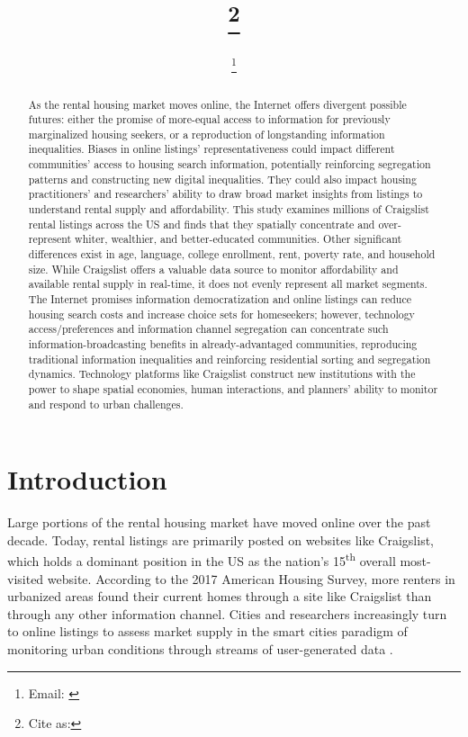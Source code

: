 \documentclass[11pt,letterpaper]{article}
\begin{document}
	
\title{\papertitle\footnote{{Cite as: \papercitation}}}
\date{\paperdate}
\author[]{\myname\footnote{Email: \href{mailto:\myemail}{\myemail}}}
\affil[]{\myaffiliation}

\maketitle

\begin{abstract}
As the rental housing market moves online, the Internet offers divergent possible futures: either the promise of more-equal access to information for previously marginalized housing seekers, or a reproduction of longstanding information inequalities. Biases in online listings' representativeness could impact different communities' access to housing search information, potentially reinforcing segregation patterns and constructing new digital inequalities. They could also impact housing practitioners' and researchers' ability to draw broad market insights from listings to understand rental supply and affordability. This study examines millions of Craigslist rental listings across the US and finds that they spatially concentrate and over-represent whiter, wealthier, and better-educated communities. Other significant differences exist in age, language, college enrollment, rent, poverty rate, and household size. While Craigslist offers a valuable data source to monitor affordability and available rental supply in real-time, it does not evenly represent all market segments. The Internet promises information democratization and online listings can reduce housing search costs and increase choice sets for homeseekers; however, technology access/preferences and information channel segregation can concentrate such information-broadcasting benefits  in already-advantaged communities, reproducing traditional information inequalities and reinforcing residential sorting and segregation dynamics. Technology platforms like Craigslist construct new institutions with the power to shape spatial economies, human interactions, and planners' ability to monitor and respond to urban challenges.
\vfill
\end{abstract}
	
\section{Introduction}

Large portions of the rental housing market have moved online over the past decade. Today, rental listings are primarily posted on websites like Craigslist, which holds a dominant position in the US as the nation's 15\textsuperscript{th} overall most-visited website. According to the 2017 American Housing Survey, more renters in urbanized areas found their current homes through a site like Craigslist than through any other information channel. Cities and researchers increasingly turn to online listings to assess market supply in the smart cities paradigm of monitoring urban conditions through streams of user-generated data \citep{boeing_technology_2019}.
\end{document}
